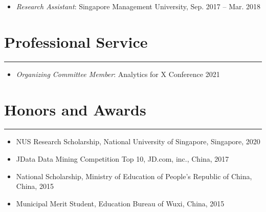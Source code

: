 \documentclass[12pt, a4paper]{article}
\begin{document}
{\begin{itemize}[leftmargin=36pt, itemsep=4pt, parsep=0.2pt, topsep=1pt]
  \item {\it Research Assistant}: Singapore Management University, Sep. 2017 -- Mar. 2018

\end{itemize}




\section*{Professional Service}
\vspace*{0.4em}
\hrule height 0.5pt
\begin{itemize}[leftmargin=36pt, itemsep=5pt, parsep=0.2pt, topsep=1pt]

	\item {\it Organizing Committee Member}: Analytics for X Conference 2021

\end{itemize}




\section*{Honors and Awards}
\vspace*{0.4em}
\hrule height 0.5pt
\begin{itemize}[leftmargin=36pt, itemsep=2pt, parsep=0.2pt, topsep=1pt]

	\item NUS Research Scholarship, National University of Singapore, Singapore, 2020
	
	\item JData Data Mining Competition Top 10, JD.com, inc., China, 2017

	\item National Scholarship, Ministry of Education of People’s Republic of China, China, 2015

	\item Municipal Merit Student, Education Bureau of Wuxi, China, 2015

\end{itemize}



}
\end{document}
